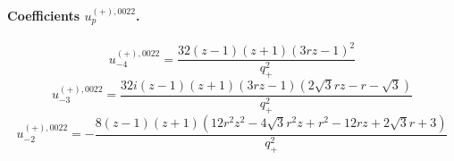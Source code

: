 \documentclass[11pt,a4paper]{article}
\begin{document}
\paragraph{Coefficients $u_p^{(+),0022}$.}
\begin{equation}
u_{-4}^{(+),0022}=\frac{32 \left(z - 1\right) \left(z + 1\right) \left(3 r z - 1\right)^{2}}{q_{+}^{2}}
\label{eq:cat-auxiliary-plus-0022-m4}
\end{equation}
\begin{equation}
u_{-3}^{(+),0022}=\frac{32 i \left(z - 1\right) \left(z + 1\right) \left(3 r z - 1\right) \left(2 \sqrt{3} r z - r - \sqrt{3}\right)}{q_{+}^{2}}
\label{eq:cat-auxiliary-plus-0022-m3}
\end{equation}
\begin{equation}
u_{-2}^{(+),0022}=- \frac{8 \left(z - 1\right) \left(z + 1\right) \left(12 r^{2} z^{2} - 4 \sqrt{3} r^{2} z + r^{2} - 12 r z + 2 \sqrt{3} r + 3\right)}{q_{+}^{2}}
\label{eq:cat-auxiliary-plus-0022-m2}
\end{equation}
\end{document}
